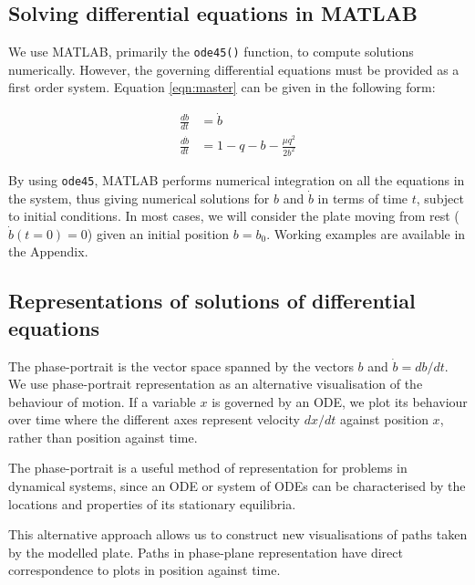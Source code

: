 \documentclass{article}
\begin{document}
\subsection{Solving differential equations in MATLAB}

We use MATLAB, primarily the \texttt{ode45()} function, to compute solutions numerically.
However, the governing differential equations must be provided as a first order system.
Equation \ref{eqn:master} can be given in the following form:

\begin{align}
    \frac{db}{dt}       & = \dot{b}                          \\
    \frac{d\dot{b}}{dt} & = 1 - q - b - \frac{\mu q^2}{2b^2}
    \label{eqn:first_order_system}
\end{align}

By using \texttt{ode45}, MATLAB performs numerical integration on all the equations in the system,
thus giving numerical solutions for $b$ and $\dot{b}$ in terms of time $t$, subject to initial conditions.
In most cases, we will consider the plate moving from rest ($\dot{b}(t=0) = 0$) given an initial position $b=b_0$.
Working examples are available in the Appendix.

\subsection{Representations of solutions of differential equations}

The phase-portrait is the vector space spanned by the vectors $b$ and $\dot{b}=db/dt$.
We use phase-portrait representation as an alternative visualisation of the behaviour of motion. If a variable $x$ is governed by an ODE,
we plot its behaviour over time where the different axes represent velocity $dx/dt$ against position $x$,
rather than position against time.

The phase-portrait is a useful method of representation for problems in dynamical systems,
since an ODE or system of ODEs can be characterised by the locations and properties of its stationary equilibria.

This alternative approach allows us to construct new visualisations of paths taken by the modelled plate.
Paths in phase-plane representation have direct correspondence to plots in position against time.

\end{document}
